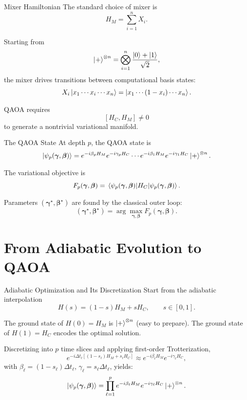 \documentclass[aspectratio=169]{beamer}
\begin{document}
\begin{frame}{Mixer Hamiltonian}
The standard choice of mixer is
\[
H_M = \sum_{i=1}^n X_i.
\]

Starting from
\[
\ket{+}^{\otimes n}
=
\bigotimes_{i=1}^n \frac{\ket{0}+\ket{1}}{\sqrt{2}},
\]
the mixer drives transitions between computational basis states:
\[
X_i\ket{x_1\cdots x_i\cdots x_n}
=
\ket{x_1\cdots (1-x_i)\cdots x_n}.
\]

QAOA requires
\[
[H_C,H_M]\neq 0
\]
to generate a nontrivial variational manifold.
\end{frame}

\begin{frame}{The QAOA State}
At depth \(p\), the QAOA state is
\[
\ket{\psi_p(\bm{\gamma},\bm{\beta})}
=
e^{-i\beta_p H_M}e^{-i\gamma_p H_C}
\cdots
e^{-i\beta_1 H_M}e^{-i\gamma_1 H_C}
\ket{+}^{\otimes n}.
\]

The variational objective is
\[
F_p(\bm{\gamma},\bm{\beta})
=
\ev{H_C}{\psi_p(\bm{\gamma},\bm{\beta})}.
\]

Parameters \((\bm{\gamma}^\star,\bm{\beta}^\star)\) are found by the classical
outer loop:
\[
(\bm{\gamma}^\star,\bm{\beta}^\star)
=
\arg\max_{\bm{\gamma},\bm{\beta}}
F_p(\bm{\gamma},\bm{\beta}).
\]
\end{frame}

\section{From Adiabatic Evolution to QAOA}

\begin{frame}{Adiabatic Optimization and Its Discretization}
Start from the adiabatic interpolation
\[
H(s) = (1-s)H_M + s H_C,
\qquad s\in[0,1].
\]

The ground state of \(H(0)=H_M\) is \(\ket{+}^{\otimes n}\) (easy to prepare).
The ground state of \(H(1)=H_C\) encodes the optimal solution.

Discretizing into \(p\) time slices and applying first-order Trotterization,
\[
e^{-i\Delta t_\ell\left[(1-s_\ell)H_M+s_\ell H_C\right]}
\approx
e^{-i\beta_\ell H_M}e^{-i\gamma_\ell H_C},
\]
with \(\beta_\ell=(1-s_\ell)\Delta t_\ell\), \(\gamma_\ell=s_\ell\Delta t_\ell\), yields:
\[
\ket{\psi_p(\bm{\gamma},\bm{\beta})}
=
\prod_{\ell=1}^p e^{-i\beta_\ell H_M}e^{-i\gamma_\ell H_C}
\ket{+}^{\otimes n}.
\]
\end{frame}
\end{document}

